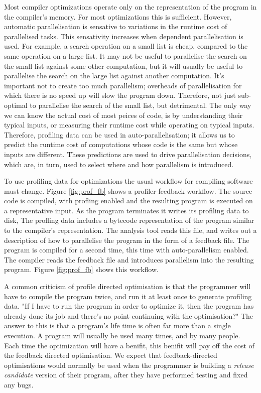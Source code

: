 Most compiler optimizations operate only on the representation of the program
in the compiler's memory.
For most optimizations this is sufficient.
However,
automatic parallelisation is sensative to variations in the runtime cost of
parallelised tasks.
This sensativity increases when dependent parallelisation is used.
For example,
a search operation on a small list is cheap, compared to the same operation on
a large list.
It may not be useful to parallelise the search on the small list against some
other computation,
but it will usually be useful to parallelise the search on the large list
against another computation.
It's important not to create too much parallelism;
overheads of parallelisation for which there is no speed up will slow the
program down.
Therefore, not just sub-optimal to parallelise the search of the small list,
but detrimental.
The only way we can know the actual cost of most peices of code,
is by understanding their typical inputs,
or measuring their runtime cost while operating on typical inputs.
Therefore,
profiling data can be used in auto-parallelisation;
it allows us to predict the runtime cost of computations whose
code is the same but whose inputs are different.
These predictions are used to drive parallelisation decisions,
which are, in turn, used to select where and how parallelism is introduced.


To use profiling data for optimizations the usual workflow for compiling
software must change.
Figure \ref{fig:prof_fb} shows a profiler-feedback workflow.
The source code is compiled, with profling enabled and the resulting program is
executed on a representative input.
As the program terminates it writes its profiling data to disk,
The profling data includes a bytecode representation of the program
similar to the compiler's representation.
The analysis tool reads this file,
and writes out a description of how to parallelise the program in the form of a
feedback file.
The program is compiled for a second time,
this time with auto-parallelism enabled.
The compiler reads the feedback file and introduces parallelism into the
resulting program.
Figure \ref{fig:prof_fb} shows this workflow.

A common criticism of profile directed optimisation is that the programmer will
have to compile the program twice,
and run it at least once to generate profiling data.
"If I have to run the program in order to optimize it, then the program has
already
done its job and there's no point continuing with the optimisation?"
The answer to this is that a program's life time is often far more than a
single execution.
A program will usually be used many times, and by many people.
Each time the optimization will have a benifit,
this benifit will pay off the cost of the feedback directed optimisation.
We expect that feedback-directed optimisations would normally be used
when the programmer is building a \emph{release candidate} version of their
program,
after they have performed testing and fixed any bugs.

